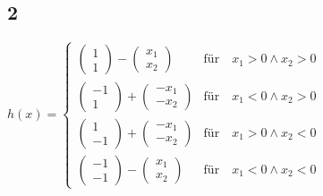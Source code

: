 \subsection{2}
$h(x) = \begin{cases}
\begin{pmatrix}
1 \\ 
1
\end{pmatrix} - \begin{pmatrix}
x_{1} \\ 
x_{2}
\end{pmatrix}   & \text{für} \quad x_{1} > 0 \land x_{2} > 0 \\
\begin{pmatrix}
-1 \\ 
1
\end{pmatrix} + \begin{pmatrix}
-x_{1} \\ 
-x_{2}
\end{pmatrix}   & \text{für} \quad x_{1} < 0 \land x_{2} > 0 \\
\begin{pmatrix}
1 \\ 
-1
\end{pmatrix} + \begin{pmatrix}
-x_{1} \\ 
-x_{2}
\end{pmatrix}   & \text{für} \quad x_{1} > 0 \land x_{2} < 0 \\
\begin{pmatrix}
-1 \\ 
-1
\end{pmatrix} - \begin{pmatrix}
x_{1} \\ 
x_{2}
\end{pmatrix}   & \text{für} \quad x_{1} < 0 \land x_{2} < 0
\end{cases}$


